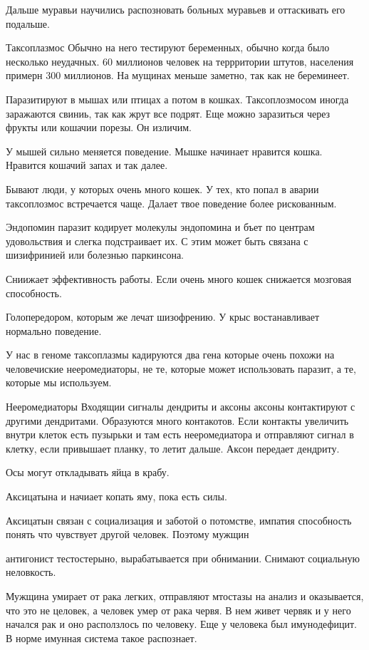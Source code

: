 Дальше муравьи научились распозновать больных муравьев и оттаскивать его подальше. 

Таксоплазмос
Обычно на него тестируют беременных, обычно 
когда было несколько неудачных. 
60 миллионов человек на террритории штутов, населения примерн 300 миллионов. 
На мущинах меньше заметно, так как не береминеет. 

Паразитируют в мышах или птицах а потом в кошках. 
Таксоплозмосом иногда заражаются свиниь, так 
как жрут все подрят. Еще можно заразиться 
через фрукты или кошачии порезы. Он изличим. 

У мышей сильно меняется поведение. Мышке начинает 
нравится кошка. Нравится кошачий запах и так далее. 

Бывают люди, у которых очень много кошек. У тех, 
кто попал в аварии таксоплозмос встречается чаще.
Далает твое поведение более рискованным. 

Эндопомин паразит кодирует молекулы эндопомина и бъет 
по центрам удовольствия и слегка подстраивает их. 
С этим может быть связана с шизифринией или болезнью 
паркинсона. 
 
Сниижает эффективность работы. Если
очень много кошек снижается мозговая способность.

Голопередором, которым же лечат шизофрению. У
крыс востанавливает нормально поведение.

У нас в геноме таксоплазмы кадируются два гена
которые очень похожи
на человечиские нееромедиаторы, не те,
которые может использовать паразит,
а те, которые мы используем.

Нееромедиаторы 
Входящии сигналы
дендриты и аксоны
аксоны контактируют с другими дендритами.
Образуются много контакотов. Если
контакты увеличить внутри клеток есть
пузырьки и там есть нееромедиатора и
отправляют сигнал в клетку, если привышает планку,
то летит дальше. Аксон передает дендриту.

Осы могут откладывать яйца в крабу. 

Аксицатына и начиает копать яму, пока есть силы.

Аксицатын связан с социализация и 
заботой о потомстве,
импатия способность понять что чувствует
другой человек.
Поэтому мужщин

антигонист тестостерыно,
вырабатывается при обнимании.
Снимают социальную неловкость.

Мужщина умирает от рака легких,
отправляют мтостазы на анализ и
оказывается, что это не целовек,
а человек умер от рака червя. В нем
живет червяк и у него начался рак и оно
расползлось по человеку. Еще
у человека был имунодефицит.
В норме имунная система такое распознает.

